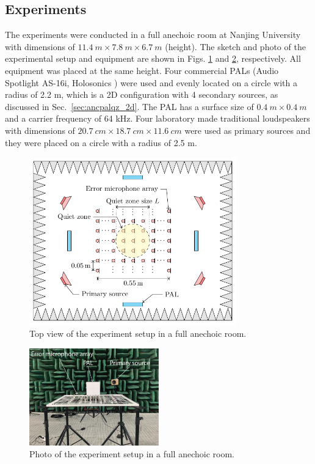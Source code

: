 \subsection{Experiments}
The experiments were conducted in a full anechoic room at Nanjing University with dimensions of $\SI{11.4}{m} \times \SI{7.8}{m} \times\SI{6.7}{m}$ (height). 
The sketch and photo of the experimental setup and equipment are shown in Figs. \ref{fig:ancpalqz_exp_sketch} and \ref{fig:ancpalqz_exp_photo}, respectively. 
All equipment was placed at the same height. 
Four commercial PALs (Audio Spotlight AS-16i, Holosonics \cite{HolosonicsAudioSpotlight24i}) were used and evenly located on a circle with a radius of 2.2 m, which is a 2D configuration with 4 secondary sources, as discussed in Sec.~\ref{sec:ancpalqz_2d}. 
The PAL has a surface size of $\SI{0.4}{m} \times \SI{ 0.4}{m}$ and a carrier frequency of 64 kHz. 
Four laboratory made traditional loudspeakers with dimensions of $\SI{20.7}{ cm} \times \SI{18.7}{cm }\times\SI{ 11.6}{cm}$ were used as primary sources and they were placed on a circle with a radius of 2.5 m. 

\begin{figure}[!htb]
    \centering
    \includegraphics[width = 0.8\textwidth]{fig/exp_setup_v1.pdf}
    \caption{ Top view of the experiment setup in a full anechoic room.}
    \label{fig:ancpalqz_exp_sketch}
\end{figure}

\begin{figure}[!htb]
    \centering
    \includegraphics[width = 0.5\textwidth]{fig/exp_setup_v3_resize.png}
    \caption{Photo of the experiment setup in a full anechoic room.}
    \label{fig:ancpalqz_exp_photo}
\end{figure}

